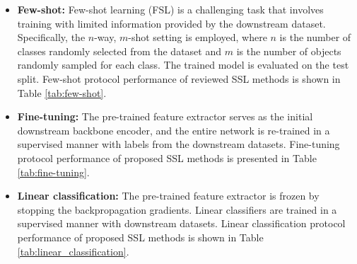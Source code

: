 \documentclass[a4paper,fleqn]{cas-dc}
\begin{document}
\begin{itemize}
    \item \textbf{Few-shot:} Few-shot learning (FSL) is a challenging task that involves training with limited information provided by the downstream dataset. Specifically, the $n$-way, $m$-shot setting is employed, where $n$ is the number of classes randomly selected from the dataset and $m$ is the number of objects randomly sampled for each class. The trained model is evaluated on the test split. Few-shot protocol performance of reviewed SSL methods is shown in Table \ref{tab:few-shot}.
    
    \item \textbf{Fine-tuning:} The pre-trained feature extractor serves as the initial downstream backbone encoder, and the entire network is re-trained in a supervised manner with labels from the downstream datasets. Fine-tuning protocol performance of proposed SSL methods is presented in Table \ref{tab:fine-tuning}.
    
    \item \textbf{Linear classification:} The pre-trained feature extractor is frozen by stopping the backpropagation gradients. Linear classifiers are trained in a supervised manner with downstream datasets. Linear classification protocol performance of proposed SSL methods is shown in Table \ref{tab:linear_classification}.
\end{itemize}
\end{document}
